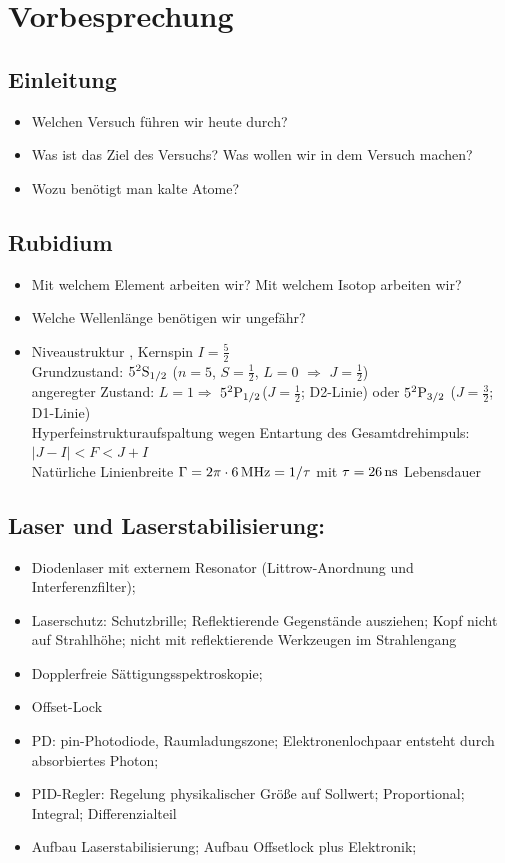 \documentclass[10pt,a4paper]{extarticle}
\begin{document}
\section*{Vorbesprechung}

\subsection*{Einleitung}
\begin{itemize}
\item Welchen Versuch führen wir heute durch?
\item Was ist das Ziel des Versuchs? Was wollen wir in dem Versuch machen?
\item Wozu benötigt man kalte Atome?
\end{itemize}

\subsection*{Rubidium}
\begin{itemize}
\item Mit welchem Element arbeiten wir? Mit welchem Isotop arbeiten wir? 
\item Welche Wellenlänge benötigen wir ungefähr? 
\item Niveaustruktur , Kernspin $I=\frac{5}{2}$ \\ 
Grundzustand: $5^2\rm{S}_{1/2}$ ($n=5$, $S=\frac{1}{2}$, $L=0$ $\Rightarrow$ $J=\frac{1}{2}$) \\
angeregter Zustand: $L=1 \Rightarrow$ $5^2\rm{P}_{1/2}$($J=\frac{1}{2}$; D2-Linie) oder $5^2\rm{P}_{3/2}$ ($J=\frac{3}{2}$; D1-Linie) \\
Hyperfeinstrukturaufspaltung wegen Entartung des Gesamtdrehimpuls: $|J-I|<F<J+I$ \\
Natürliche Linienbreite  $\Gamma=2\pi\cdot\unit[6]{MHz} =1/\tau$ mit  $\tau=\unit[26]{ns}$ Lebensdauer
\end{itemize}

\subsection*{Laser und Laserstabilisierung:}
\begin{itemize}
\item Diodenlaser mit externem Resonator (Littrow-Anordnung und Interferenzfilter);
\item Laserschutz: Schutzbrille; Reflektierende Gegenstände ausziehen; Kopf nicht auf Strahlhöhe; nicht mit reflektierende Werkzeugen im Strahlengang
\item Dopplerfreie Sättigungsspektroskopie;
\item Offset-Lock
\item PD: pin-Photodiode, Raumladungszone; Elektronenlochpaar entsteht durch absorbiertes Photon;
\item PID-Regler: Regelung physikalischer Größe auf Sollwert; Proportional; Integral; Differenzialteil
\item Aufbau Laserstabilisierung; Aufbau Offsetlock plus Elektronik;
\end{itemize}
\end{document}
